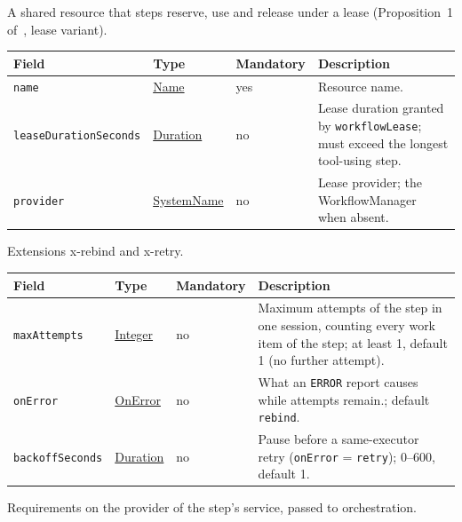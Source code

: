 \documentclass[a4paper]{arrowhead}
\newcommand{\mref}[1]{{\textcolor{ArrowheadPurple}{\hyperref[sec:model:#1]{#1}}}}
\newcommand{\pref}[1]{{\textcolor{ArrowheadGrey}{\hyperref[sec:model:primitives:#1]{#1}}}}
\begin{document}
A shared resource that steps reserve, use and release under a lease (Proposition~1 of~\cite{varga2026}, lease variant).

{\small
\begin{longtable}{|p{3.7cm}|p{4.2cm}|p{1.6cm}|p{6.3cm}|}

\hline
\rowcolor{gray!33} Field & Type & Mandatory & Description \\ \hline
\endhead
\texttt{name} & \pref{Name} & yes & Resource name. \\ \hline
\texttt{lease\allowbreak{}Duration\allowbreak{}Seconds} & \pref{Duration} & no & Lease duration granted by \texttt{workflowLease}; must exceed the longest tool-using step. \\ \hline
\texttt{provider} & \pref{SystemName} & no & Lease provider; the WorkflowManager when absent. \\ \hline
\end{longtable}
}

Extensions x-rebind and x-retry.

{\small
\begin{longtable}{|p{3.7cm}|p{4.2cm}|p{1.6cm}|p{6.3cm}|}

\hline
\rowcolor{gray!33} Field & Type & Mandatory & Description \\ \hline
\endhead
\texttt{maxAttempts} & \pref{Integer} & no & Maximum attempts of the step in one session, counting every work item of the step; at least 1, default 1 (no further attempt). \\ \hline
\texttt{onError} & \mref{OnError} & no & What an \texttt{ERROR} report causes while attempts remain.; default \texttt{rebind}. \\ \hline
\texttt{backoff\allowbreak{}Seconds} & \pref{Duration} & no & Pause before a same-executor retry (\texttt{onError} = \texttt{retry}); 0--600, default 1. \\ \hline
\end{longtable}
}

Requirements on the provider of the step's service, passed to orchestration.
\end{document}
